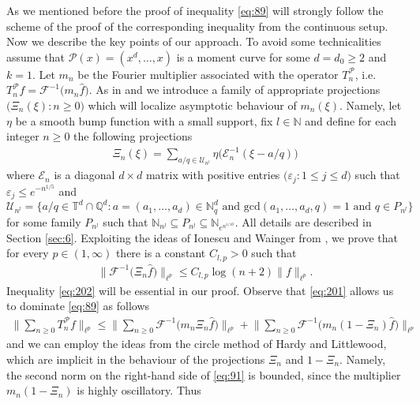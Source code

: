 \documentclass[a4paper,oneside]{amsart}
\theoremstyle{plain}
\theoremstyle{definition}
\numberwithin{equation}{section}
\theoremstyle{plain}
\newcommand{\TT}{\mathbb{T}}
\newcommand{\NN}{\mathbb{N}}
\newcommand{\QQ}{\mathbb{Q}}
\newcommand{\calP}{\mathcal{P}}
\newcommand{\calF}{\mathcal{F}}
\newcommand{\8}{\infty}
\begin{document}
As we mentioned before the proof of inequality \eqref{eq:89} will
strongly follow the scheme of the proof of the corresponding
 inequality from the continuous setup. Now we describe the key points
 of our approach. To avoid some technicalities assume
that $\calP(x)=(x^d,\ldots, x)$ is a moment curve for some $d=d_0\ge2$
and $k=1$. Let $m_n$ be the Fourier multiplier associated with the
operator $T_n^{\calP}$, i.e. $T_n^{\calP}f=\mathcal F^{-1}\big(m_n\hat
f\big)$. As in \cite{mst1} and \cite{mst2} we introduce a family of
appropriate projections $\big(\Xi_n(\xi): n\ge0\big)$ which will
localize asymptotic behaviour of $m_n(\xi)$. Namely, let
$\eta$ be a smooth bump function with a small support, fix $l \in
\NN$ and define for each integer $n\ge0$ the following projections
\begin{align}
\label{eq:201}
	\Xi_{n}(\xi)
	=\sum_{a/q \in\mathscr{U}_{n^l}}
	 \eta\big(\mathcal E_n^{-1}(\xi - a/q)\big)
      \end{align}
where  $\mathcal E_n$
is a diagonal $d\times d$  matrix with positive entries
$\big(\varepsilon_{j}: 1\le j\le d\big)$ such that
$\varepsilon_{j}\le e^{-n^{1/5}}$   and
\[
\mathscr{U}_{n^l}=\big\{a/q \in \TT^d\cap\QQ^d : a=(a_1, \ldots, a_d) \in
\NN^d_q \text{ and } \mathrm{gcd}(a_1, \ldots, a_d, q)=1 \text{ and }
q\in P_{n^l}\big\}
\]
for some family $P_{n^l}$ such that $\NN_{n^l}\subseteq
P_{n^l}\subseteq \NN_{e^{n^{1/10}}}$. All details are described in
Section \ref{sec:6}.  Exploiting the ideas of Ionescu and Wainger from
\cite{iw}, we prove that for every $p\in(1, \infty)$ there is a constant $C_{l,
  p}>0$ such that
\begin{align}
  \label{eq:202}
\big\|\calF^{-1}\big(\Xi_{n}\hat{f}\big)\big\|_{\ell^p}\le C_{l,
  p}\log (n+2)\|f\|_{\ell^p}.  
\end{align}
Inequality \eqref{eq:202} will be essential in our proof. Observe that
\eqref{eq:201} allows us to dominate \eqref{eq:89} as follows
\begin{align}
  \label{eq:91}
\Big\|\sum_{n\ge0}T_n^{\calP}f\Big\|_{\ell^p}\le\Big\|\sum_{n\ge0}\mathcal
F^{-1}\big(m_n\Xi_n\hat f\big)\Big\|_{\ell^p}
+\Big\|\sum_{n\ge0}\mathcal
F^{-1}\big(m_n(1-\Xi_n)\hat f\big)\Big\|_{\ell^p}  
\end{align}
and we can employ the ideas from  the circle method of Hardy and
Littlewood, which are implicit in the behaviour  of the projections
$\Xi_n$ and $1-\Xi_n$.
Namely, the second norm on the right-hand side of \eqref{eq:91} is bounded,
since the multiplier $m_n(1-\Xi_n)$ is highly oscillatory. Thus
\end{document}
